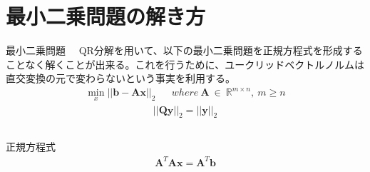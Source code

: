 \documentclass[dvipdfmx,10pt,presentation]{beamer}
\begin{document}
\section{最小二乗問題の解き方}
\label{sec:orgc887d59}
\begin{frame}[allowframebreaks]{最小二乗問題}
　QR分解を用いて、以下の最小二乗問題を正規方程式を形成することなく解くことが出来る。これを行うために、ユークリッドベクトルノルムは直交変換の元で変わらないという事実を利用する。\\
\begin{align}
\min_{x}||\bm{b}-\bm{A}\bm{x}||_2&&where\ \bm{A}\ \in\ \mathbb{R}^{m\times n},\ m\geq n
\tag{5.3}
\end{align}
\begin{align*}
||\bm{Q}\bm{y}||_2=||\bm{y}||_2  
\end{align*}

\begin{columns}
\begin{column}{1.00\columnwidth}
\begin{block}{正規方程式}
\begin{align*}
\bm{A}^T\bm{A}\bm{x} = \bm{A}^T\bm{b}
\end{align*}
\end{block}
\end{column}
\end{columns}
\end{frame}
\end{document}
